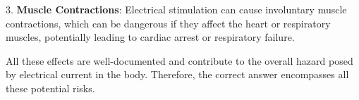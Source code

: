 3. \textbf{Muscle Contractions}: Electrical stimulation can cause involuntary muscle contractions, which can be dangerous if they affect the heart or respiratory muscles, potentially leading to cardiac arrest or respiratory failure.

All these effects are well-documented and contribute to the overall hazard posed by electrical current in the body. Therefore, the correct answer encompasses all these potential risks.

